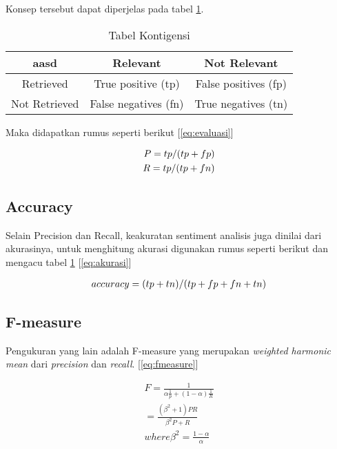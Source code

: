 Konsep tersebut dapat diperjelas pada tabel \ref{tab:konsep}.

\begin{table}[hbt]
	\caption{Tabel Kontigensi}
	\centering
	\begin{adjustbox}{max width=\textwidth}
		\begin{tabular}{*{3}{c}}%
			\toprule
			aasd & Relevant & Not Relevant \\
			\midrule
			Retrieved & True positive (tp) & False positives (fp) \\
			Not Retrieved & False negatives (fn) & True negatives (tn) \\
			\bottomrule
		\end{tabular}
	\end{adjustbox}
	\label{tab:konsep}
\end{table}

Maka didapatkan rumus seperti berikut [\ref{eq:evaluasi}]

\begin{equation}
\begin{split}
\tiny
P = tp/(tp+fp) \\ 
R = tp/(tp+fn)
\label{eq:evaluasi}
\normalsize
\end{split}
\end{equation}

\subsection*{Accuracy}
Selain Precision dan Recall, keakuratan sentiment analisis juga dinilai dari akurasinya, untuk menghitung akurasi digunakan rumus seperti berikut dan mengacu tabel \ref{tab:konsep} [\ref{eq:akurasi}]

\begin{equation}
\begin{split}
\tiny
accuracy = (tp+tn)/(tp+fp+fn+tn)
\label{eq:akurasi}
\normalsize
\end{split}
\end{equation}

\subsection*{F-measure}
Pengukuran yang lain adalah F-measure yang merupakan \textit{weighted harmonic mean} dari \textit{precision} dan \textit{recall}. [\ref{eq:fmeasure}]

\begin{equation}
\begin{split}
F = \frac{1}{\alpha \frac{1}{p} + (1 - \alpha)\frac{1}{R}} \\
= \frac{(\beta^2 + 1)PR}{\beta^2P + R} \\
where \beta^2 = \frac{1 - \alpha}{\alpha}
\label{eq:fmeasure}
\end{split}
\end{equation}

